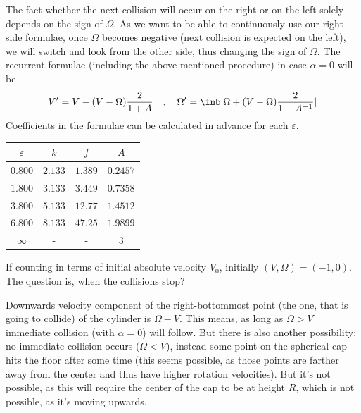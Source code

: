 The fact whether the next collision will occur on the right or on the left 
solely depends on the sign of $\Omega$.
As we want to be able to continuously use our right side formulae,
once $\Omega$ becomes negative (next collision is expected on the left),
we will switch and look from the other side, thus changing the sign of $\Omega$.
The recurrent formulae (including the above-mentioned procedure) in case $\alpha=0$ will be
\begin{equation}
    V'=V-(V-\Omega)\frac{2}{1+A} \quad,\quad
    \Omega'=\inb|{\Omega+(V-\Omega)\frac{2}{1+A^{-1}}}|
\end{equation}
Coefficients in the formulae can be calculated in advance for each $\varepsilon$.
\begin{center}
\begin{tabular}{c|c|c|c}
    $\varepsilon$ & $k$ & $f$ &
    \(\displaystyle A \) \\
    \hline
    $0.800$ & $2.133$ & $1.389$ & $0.2457$ \\
    $1.800$ & $3.133$ & $3.449$ & $0.7358$ \\
    $3.800$ & $5.133$ & $12.77$ & $1.4512$ \\
    $6.800$ & $8.133$ & $47.25$ & $1.9899$ \\
    $\infty$ & - & - & $3$
\end{tabular}
\end{center}
If counting in terms of initial absolute velocity $V_0$, initially
$(V,\Omega)=(-1,0)$. The question is, when the collisions stop?

Downwards velocity component of the right-bottommost point
(the one, that is going to collide) of the cylinder is $\Omega - V$.
This means, as long as $\Omega > V$ immediate collision (with $\alpha=0$) will follow.
But there is also another possibility: no immediate collision occurs
($\Omega < V$),
instead some point on the spherical cap hits the floor after some time
(this seems possible, as those points are farther away from the center
and thus have higher rotation velocities).
But it's not possible, as this will require the center of the cap
to be at height $R$, which is not possible, as it's moving upwards.

